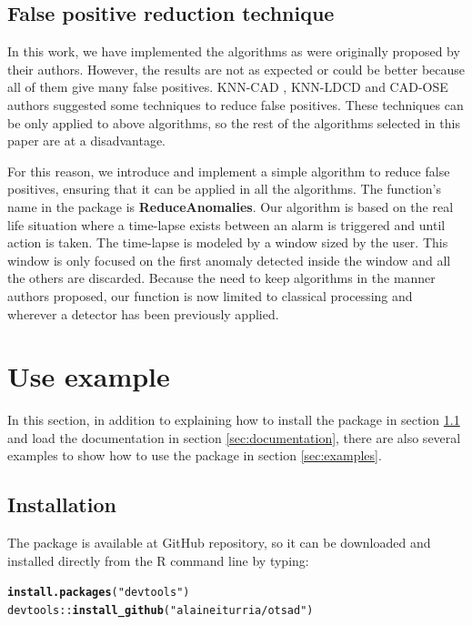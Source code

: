 \documentclass[a4paper]{article}\usepackage[]{graphicx}\usepackage[]{color}
\makeatletter
\newcommand{\hlstr}[1]{\textcolor[rgb]{0.192,0.494,0.8}{#1}}%
\newcommand{\hlopt}[1]{\textcolor[rgb]{0,0,0}{#1}}%
\newcommand{\hlstd}[1]{\textcolor[rgb]{0.345,0.345,0.345}{#1}}%
\newcommand{\hlkwd}[1]{\textcolor[rgb]{0.737,0.353,0.396}{\textbf{#1}}}%
\newenvironment{kframe}{%
 \def\at@end@of@kframe{}%
 \ifinner\ifhmode%
  \def\at@end@of@kframe{\end{minipage}}%
  \begin{minipage}{\columnwidth}%
 \fi\fi%
 \def\FrameCommand##1{\hskip\@totalleftmargin \hskip-\fboxsep
 \colorbox{shadecolor}{##1}\hskip-\fboxsep
     \hskip-\linewidth \hskip-\@totalleftmargin \hskip\columnwidth}%
 \MakeFramed {\advance\hsize-\width
   \@totalleftmargin\z@ \linewidth\hsize
   \@setminipage}}%
 {\par\unskip\endMakeFramed%
 \at@end@of@kframe}
\newenvironment{knitrout}{}{} %
\makeatother
\begin{document}
\subsection{False positive reduction technique} \label{sec:fp}

In this work, we have implemented the algorithms as were originally proposed by their authors. However, the results are not as expected or could be better because all of them give many false positives. KNN-CAD \cite{2016arXiv160804585B}, KNN-LDCD \cite{2017arXiv170603412I} and CAD-OSE \cite{2018-Smirnov-ContextualAnomalyDetector} authors suggested some techniques to reduce false positives. These techniques can be only applied to above algorithms, so the rest of the algorithms selected in this paper are at a disadvantage.

For this reason, we introduce and implement a simple algorithm to reduce false positives, ensuring that it can be applied in all the algorithms. The function's name in the package is \textbf{ReduceAnomalies}. Our algorithm is based on the real life situation where a time-lapse exists between an alarm is triggered and until action is taken. The time-lapse is modeled by a window sized by the user. This window is only focused on the first anomaly detected inside the window and all the others are discarded. Because the need to keep algorithms in the manner authors proposed, our function is now limited to classical processing and wherever a detector has been previously applied.

\section{Use example}\label{sec:examplesec}

In this section, in addition to explaining how to install the package in section \ref{sec:installation} and load the documentation in section \ref{sec:documentation}, there are also several examples to show how to use the package in section \ref{sec:examples}.

\subsection{Installation}\label{sec:installation}

The  package is available at GitHub repository, so it can be downloaded and installed directly from the R command line by typing:

\begin{knitrout}
\color{fgcolor}\begin{kframe}
\begin{alltt}
\hlkwd{install.packages}\hlstd{(}\hlstr{"devtools"}\hlstd{)}
\hlstd{devtools}\hlopt{::}\hlkwd{install_github}\hlstd{(}\hlstr{"alaineiturria/otsad"}\hlstd{)}
\end{alltt}
\end{kframe}
\end{knitrout}
\end{document}
